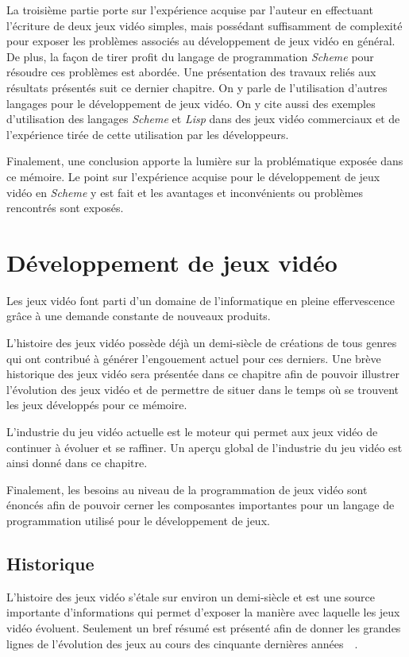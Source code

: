 \documentclass[12pt,twoside,letterpaper,francais]{book}
\newcommand{\lisp}{{\textit{Lisp }}}
\newcommand{\Schemelang}{{\textit{Scheme }}}
\begin{document}
La troisième partie porte sur l'expérience acquise par l'auteur en
effectuant l'écriture de deux jeux vidéo simples, mais possédant
suffisamment de complexité pour exposer les problèmes associés au
développement de jeux vidéo en général. De plus, la façon de tirer
profit du langage de programmation \Schemelang pour résoudre ces
problèmes est abordée. Une présentation des travaux reliés aux
résultats présentés suit ce dernier chapitre. On y parle de
l'utilisation d'autres langages pour le développement de jeux
vidéo. On y cite aussi des exemples d'utilisation des langages
\Schemelang et \lisp dans des jeux vidéo commerciaux et de
l'expérience tirée de cette utilisation par les développeurs.

Finalement, une conclusion apporte la lumière sur la problématique
exposée dans ce mémoire. Le point sur l'expérience acquise pour le
développement de jeux vidéo en \Schemelang y est fait et les avantages
et inconvénients ou problèmes rencontrés sont exposés.


\clearpage

\chapter{Développement de jeux vidéo} \label{Chap:JV}
Les jeux vidéo font parti d'un domaine de l'informatique en pleine
effervescence grâce à une demande constante de nouveaux
produits. 

L'histoire des jeux vidéo possède déjà un demi-siècle de créations de
tous genres qui ont contribué à générer l'engouement actuel pour ces
derniers. Une brève historique des jeux vidéo sera présentée dans ce
chapitre afin de pouvoir illustrer l'évolution des jeux vidéo et de
permettre de situer dans le temps où se trouvent les jeux développés
pour ce mémoire.

L'industrie du jeu vidéo actuelle est le moteur qui permet aux jeux
vidéo de continuer à évoluer et se raffiner. Un aperçu global de
l'industrie du jeu vidéo est ainsi donné dans ce chapitre.

Finalement, les besoins au niveau de la programmation de jeux vidéo
sont énoncés afin de pouvoir cerner les composantes importantes pour
un langage de programmation utilisé pour le développement de jeux.


\FloatBarrier
\section{Historique}
L'histoire des jeux vidéo s'étale sur environ un demi-siècle et est
une source importante d'informations qui permet d'exposer la manière
avec laquelle les jeux vidéo évoluent. Seulement un bref résumé est
présenté afin de donner les grandes lignes de l'évolution des
jeux au cours des cinquante dernières
années~\cite{VIDEOGAMES_history}~\cite{HISCORE}.
\end{document}
